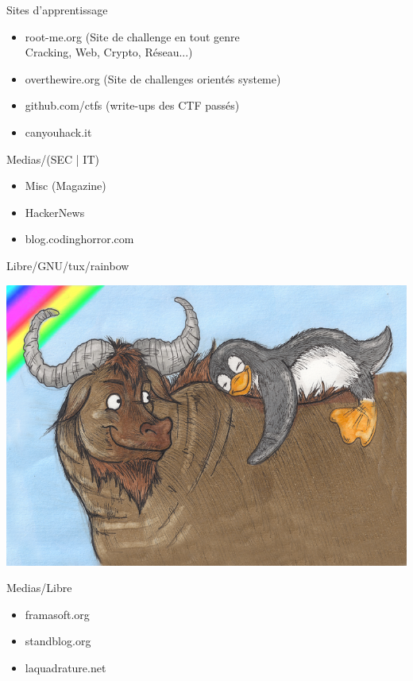 \documentclass{beamer}
\begin{document}
\begin{frame}{Sites d'apprentissage}
	\begin{itemize}
		\item root-me.org (Site de challenge en tout genre\\
		Cracking, Web, Crypto, Réseau...)
			
		\item overthewire.org (Site de challenges orientés systeme)
		
		\item github.com/ctfs (write-ups des CTF passés)
		
		\item canyouhack.it
	\end{itemize}
\end{frame}

\begin{frame}{Medias/(SEC | IT)}
	\begin{itemize}
		\item Misc (Magazine)
		\item HackerNews
		\item blog.codinghorror.com
	\end{itemize}
\end{frame}

\begin{frame}{Libre/GNU/tux/rainbow}
	\centerline{\includegraphics[scale=2.1]{libre2.png}}
\end{frame}

\begin{frame}{Medias/Libre}
	\begin{itemize}
		\item framasoft.org 
		\item standblog.org
		\item laquadrature.net
	\end{itemize}
\end{frame}
\end{document}
